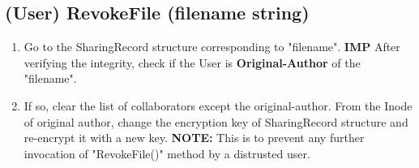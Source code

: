 \documentclass[a4paper, 12pt]{scrartcl}
\begin{document}
\subsection{(User) RevokeFile (filename string)}
\begin{enumerate}
	\itemsep0em
	\item Go to the SharingRecord structure corresponding to "filename". \textbf{IMP} After verifying the integrity, check if the User is \textbf{Original-Author} of the "filename".
	\item If so, clear the list of collaborators except the original-author. From the Inode of original author, change the encryption key of SharingRecord structure and re-encrypt it with a new key. \textbf{NOTE:} This is to prevent any further invocation of "RevokeFile()" method by a distrusted user.
\end{enumerate}
\end{document}
